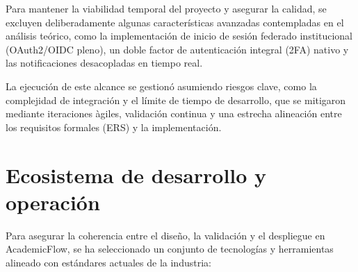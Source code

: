 Para mantener la viabilidad temporal del proyecto y asegurar la calidad, se excluyen deliberadamente algunas caracter\'isticas avanzadas contempladas en el an\'alisis te\'orico, como la implementaci\'on de inicio de sesi\'on federado institucional (OAuth2/OIDC pleno), un doble factor de autenticaci\'on integral (2FA) nativo y las notificaciones desacopladas en tiempo real.

La ejecuci\'on de este alcance se gestion\'o asumiendo riesgos clave, como la complejidad de integraci\'on y el l\'imite de tiempo de desarrollo, que se mitigaron mediante iteraciones \`agiles, validaci\'on continua y una estrecha alineaci\'on entre los requisitos formales (ERS) y la implementaci\'on.

\FloatBarrier
\section{Ecosistema de desarrollo y operaci\'on}

Para asegurar la coherencia entre el dise\~no, la validaci\'on y el despliegue en AcademicFlow, se ha seleccionado un conjunto de tecnolog\'ias y herramientas alineado con est\'andares actuales de la industria:

